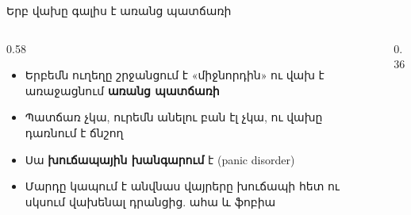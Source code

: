 \begin{frame}{Երբ վախը գալիս է առանց պատճառի}
  \begin{columns}[c]
    \begin{column}{0.58\textwidth}
      \begin{itemize}
        \item Երբեմն ուղեղը շրջանցում է «միջնորդին» ու վախ է առաջացնում \textbf{առանց պատճառի}
        \item<2-> Պատճառ չկա, ուրեմն անելու բան էլ չկա, ու վախը դառնում է ճնշող
        \item<3-> Սա \textbf{խուճապային խանգարում} է (panic disorder)
        \item<4-> Մարդը կապում է անվնաս վայրերը խուճապի հետ ու սկսում վախենալ դրանցից. ահա և ֆոբիա
      \end{itemize}
    \end{column}
    \begin{column}{0.36\textwidth}
      \centering
    \end{column}
  \end{columns}
\end{frame}

